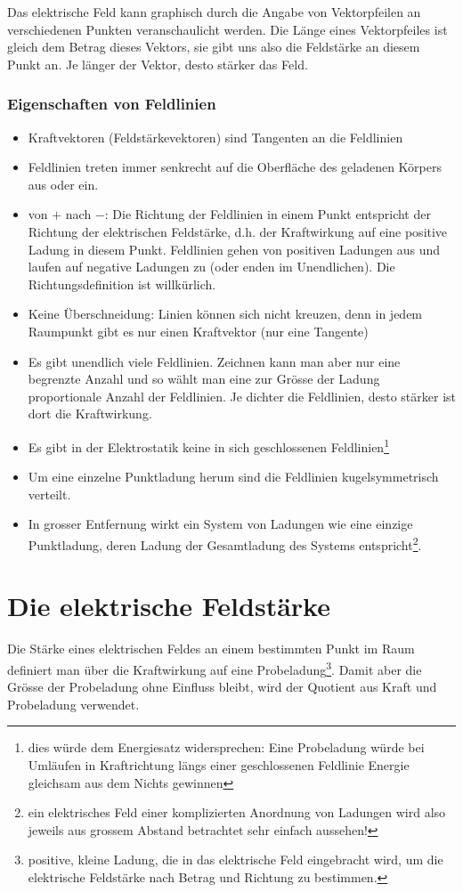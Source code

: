 \documentclass[11pt,twoside=false,open=any]{scrbook}
\begin{document}
Das elektrische Feld kann graphisch durch die Angabe von Vektorpfeilen an verschiedenen Punkten veranschaulicht werden. Die Länge eines Vektorpfeiles ist gleich dem Betrag dieses Vektors, sie gibt uns also die Feldstärke an diesem Punkt an. Je länger der Vektor, desto stärker das Feld.
\subsubsection{Eigenschaften von Feldlinien}

\begin{itemize}
\item Kraftvektoren (Feldstärkevektoren) sind Tangenten  an die Feldlinien
\item Feldlinien treten immer senkrecht auf die Oberfläche des geladenen Körpers aus oder ein.
\item  von $+$ nach $-$: Die Richtung der Feldlinien in einem Punkt entspricht der Richtung der elektrischen Feldstärke, d.h. der Kraftwirkung auf eine positive Ladung in diesem Punkt. Feldlinien gehen von positiven Ladungen aus und laufen auf negative Ladungen zu (oder enden im Unendlichen). Die Richtungsdefinition ist willkürlich.
\item Keine Überschneidung: Linien können sich nicht kreuzen, denn in jedem Raumpunkt gibt es nur einen Kraftvektor (nur eine Tangente)
\item Es gibt unendlich viele Feldlinien. Zeichnen kann man aber nur eine begrenzte Anzahl und so wählt man eine zur Grösse der Ladung proportionale Anzahl der Feldlinien. Je dichter die Feldlinien, desto stärker ist dort die Kraftwirkung.
\item Es gibt in der Elektrostatik keine in sich geschlossenen Feldlinien\footnote{dies würde dem Energiesatz widersprechen: Eine Probeladung würde bei Umläufen in Kraftrichtung längs einer geschlossenen Feldlinie Energie gleichsam aus dem Nichts gewinnen}
\item Um eine einzelne Punktladung herum sind die Feldlinien kugelsymmetrisch verteilt.
\item In grosser Entfernung wirkt ein System von Ladungen wie eine einzige Punktladung, deren Ladung der Gesamtladung des Systems entspricht\footnote{ein elektrisches Feld einer komplizierten Anordnung von Ladungen wird also jeweils aus grossem Abstand betrachtet sehr einfach aussehen!}.
\end{itemize}

\section{Die elektrische Feldstärke}
Die Stärke eines elektrischen Feldes an einem bestimmten Punkt im Raum definiert man über die Kraftwirkung auf eine Probeladung\footnote{positive, kleine Ladung, die in das elektrische Feld eingebracht wird, um die elektrische Feldstärke nach Betrag und Richtung zu bestimmen.}. Damit aber die Grösse der Probeladung ohne Einfluss bleibt, wird der Quotient aus Kraft und Probeladung verwendet.
\end{document}
